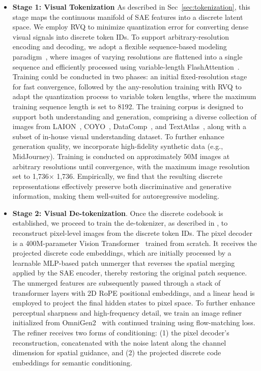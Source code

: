 \documentclass{article}
\begin{document}
\begin{itemize}
\item
\textbf{Stage 1: Visual Tokenization} As described in Sec~\ref{sec:tokenization}, this stage maps the continuous manifold of SAE features into a discrete latent space. We employ RVQ to minimize quantization error for converting dense visual signals into discrete token IDs.
To support arbitrary-resolution encoding and decoding, we adopt a flexible sequence-based modeling paradigm~\cite{packnpack}, where images of varying resolutions are flattened into a single sequence and efficiently processed using variable-length FlashAttention~\cite{dao2022flashattention,dao2023flashattention}. Training could be conducted in two phases: an initial fixed-resolution stage for fast convergence, followed by the any-resolution training with RVQ to adapt the quantization process to variable token lengths, where the maximum training sequence length is set to 8192. The training corpus is designed to support both understanding and generation, comprising a diverse collection of images from LAION~\cite{schuhmann2022laion}, COYO~\cite{kakaobrain2022coyo-700m}, DataComp~\cite{gadre2023datacomp}, and TextAtlas~\cite{wang2025textatlas5m}, along with a subset of in-house visual understanding dataset. To further enhance generation quality, we incorporate high-fidelity synthetic data (e.g., MidJourney). Training is conducted on approximately 50M images at arbitrary resolutions until convergence, with the maximum image resolution set to 1,736$\times$ 1,736. Empirically, we find that the resulting discrete representations effectively preserve both discriminative and generative information, making them well-suited for autoregressive modeling.
\item
\textbf{Stage 2: Visual De-tokenization}. Once the discrete codebook is established, we proceed to train the de-tokenizer, as described in , to reconstruct pixel-level images from the discrete token IDs. The pixel decoder is a 400M-parameter Vision Transformer~\cite{dosovitskiy2020image, QLIP} trained from scratch. It receives the projected discrete code embeddings, which are initially processed by a learnable MLP-based patch unmerger that reverses the spatial merging applied by the SAE encoder, thereby restoring the original patch sequence. The unmerged features are subsequently passed through a stack of transformer layers with 2D RoPE positional embeddings, and a linear head is employed to project the final hidden states to pixel space.
To further enhance perceptual sharpness and high-frequency detail, we train an image refiner initialized from OmniGen2~\cite{wu2025omnigen2explorationadvancedmultimodal} with continued training using flow-matching loss. The refiner receives two forms of conditioning: (1) the pixel decoder's reconstruction, concatenated with the noise latent along the channel dimension for spatial guidance, and (2) the projected discrete code embeddings for semantic conditioning. 

\end{itemize}
\end{document}
